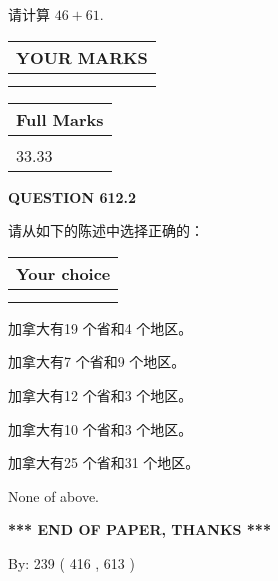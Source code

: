 \documentclass{ctexart}
\begin{document}
  
 
请计算 $ %
46 +  %
61 $.
 

 

 
  
\vspace{0.2in}
  
\noindent\begin{tabular}{|l|}
\hline
 YOUR MARKS  \\
\hline
 \\ 
 \\ 
\hline
\end{tabular}
\hspace{0.05in} \begin{tabular}{|l|}
\hline
 Full Marks  \\
\hline
 \\ 
33.33 \\
\hline
\end{tabular}
{\textbf{\Large{QUESTION
612.2 
}}}
  
  
请从如下的陈述中选择正确的：
  
  
\noindent\hspace{3.0in} \begin{tabular}{|l|}
\hline
Your choice \\
\hline
 \\ 
 \\ 
\hline
\end{tabular}
  
  
 
 
加拿大有19 个省和4 个地区。
 
 
加拿大有7 个省和9 个地区。
 
 
加拿大有12 个省和3 个地区。
 
 
加拿大有10 个省和3 个地区。
 
 
加拿大有25 个省和31 个地区。
 
 
 None of above.
 
 
   
   
 \vspace{0.2in}
 
   
   
   
   
\vspace{1.0in} 
{\textbf{\large{ *** END OF PAPER, THANKS *** }}} 
   
   
\hspace{1.0in} By: 
 239 ( 416 ,  613 )
   
\end{document}
